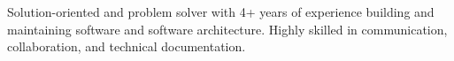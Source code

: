 \section{}
\small{  
    Solution-oriented and problem solver with 4+ years of experience building and maintaining software and software architecture. Highly skilled in communication, collaboration, and technical documentation.
}